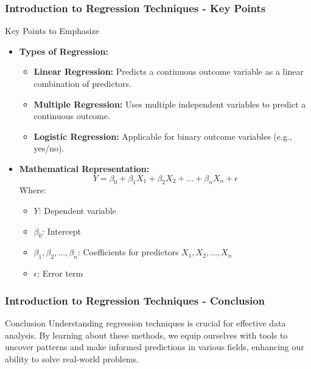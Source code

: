 \documentclass[aspectratio=169]{beamer}
\begin{document}
\begin{frame}[fragile]
    \frametitle{Introduction to Regression Techniques - Key Points}
    \begin{block}{Key Points to Emphasize}
        \begin{itemize}
            \item \textbf{Types of Regression:}
                \begin{itemize}
                    \item \textbf{Linear Regression:} Predicts a continuous outcome variable as a linear combination of predictors.
                    \item \textbf{Multiple Regression:} Uses multiple independent variables to predict a continuous outcome.
                    \item \textbf{Logistic Regression:} Applicable for binary outcome variables (e.g., yes/no).
                \end{itemize}
            \item \textbf{Mathematical Representation:}
                \begin{equation}
                    Y = \beta_0 + \beta_1X_1 + \beta_2X_2 + ... + \beta_nX_n + \epsilon
                \end{equation}
                Where:
                \begin{itemize}
                    \item \( Y \): Dependent variable
                    \item \( \beta_0 \): Intercept
                    \item \( \beta_1, \beta_2, ..., \beta_n \): Coefficients for predictors \( X_1, X_2, ..., X_n \)
                    \item \( \epsilon \): Error term
                \end{itemize}
        \end{itemize}
    \end{block}
\end{frame}

\begin{frame}[fragile]
    \frametitle{Introduction to Regression Techniques - Conclusion}
    \begin{block}{Conclusion}
        Understanding regression techniques is crucial for effective data analysis. By learning about these methods, we equip ourselves with tools to uncover patterns and make informed predictions in various fields, enhancing our ability to solve real-world problems.
    \end{block}
\end{frame}
\end{document}
